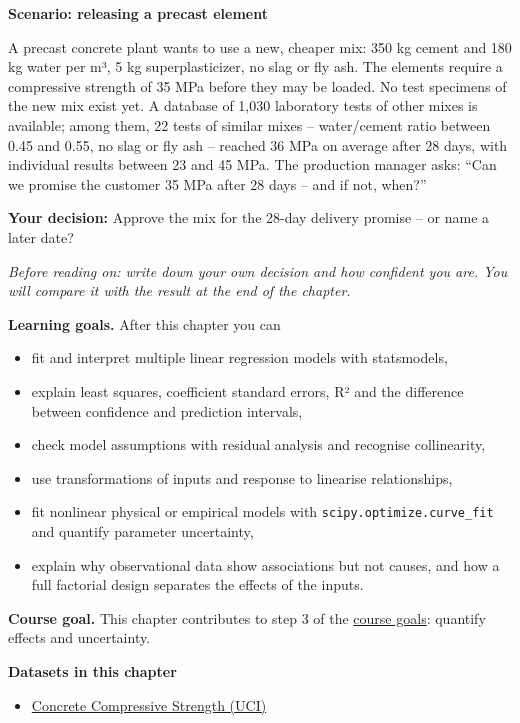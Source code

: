 \documentclass[
  letterpaper,
  DIV=11,
  numbers=noendperiod]{scrreprt}
\providecommand{\tightlist}{%
  \setlength{\itemsep}{0pt}\setlength{\parskip}{0pt}}\usepackage{longtable,booktabs,array}
\begin{document}
\textbf{Scenario: releasing a precast element}

A precast concrete plant wants to use a new, cheaper mix: 350 kg cement
and 180 kg water per m³, 5 kg superplasticizer, no slag or fly ash. The
elements require a compressive strength of 35 MPa before they may be
loaded. No test specimens of the new mix exist yet. A database of 1,030
laboratory tests of other mixes is available; among them, 22 tests of
similar mixes -- water/cement ratio between 0.45 and 0.55, no slag or
fly ash -- reached 36 MPa on average after 28 days, with individual
results between 23 and 45 MPa. The production manager asks: ``Can we
promise the customer 35 MPa after 28 days -- and if not, when?''

\textbf{Your decision:} Approve the mix for the 28-day delivery promise
-- or name a later date?

\emph{Before reading on: write down your own decision and how confident
you are. You will compare it with the result at the end of the chapter.}

\textbf{Learning goals.} After this chapter you can

\begin{itemize}
\tightlist
\item
  fit and interpret multiple linear regression models with statsmodels,
\item
  explain least squares, coefficient standard errors, R² and the
  difference between confidence and prediction intervals,
\item
  check model assumptions with residual analysis and recognise
  collinearity,
\item
  use transformations of inputs and response to linearise relationships,
\item
  fit nonlinear physical or empirical models with
  \texttt{scipy.optimize.curve\_fit} and quantify parameter uncertainty,
\item
  explain why observational data show associations but not causes, and
  how a full factorial design separates the effects of the inputs.
\end{itemize}

\textbf{Course goal.} This chapter contributes to step 3 of the
\hyperref[what-you-will-be-able-to-do]{course goals}: quantify effects
and uncertainty.

\textbf{Datasets in this chapter}

\begin{itemize}
\tightlist
\item
  \href{https://archive.ics.uci.edu/dataset/165/concrete+compressive+strength}{Concrete
  Compressive Strength (UCI)}
\end{itemize}
\end{document}
